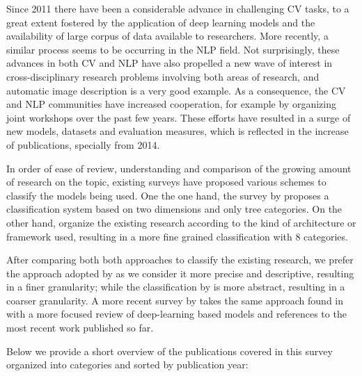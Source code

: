 Since 2011 there have been a considerable advance in challenging CV tasks, to a great extent fostered by the application of deep learning models and the availability of large corpus of data available to researchers. More recently, a similar process seems to be occurring in the NLP field. Not surprisingly, these advances in both CV and NLP have also propelled a new wave of interest in cross-disciplinary research problems involving both areas of research, and automatic image description is a very good example. As a consequence, the CV and NLP communities have increased cooperation, for example by organizing joint workshops over the past few years. These efforts have resulted in a surge of new models, datasets and evaluation measures, which is reflected in the increase of publications, specially from 2014. 

In order of ease of review, understanding and comparison of the growing amount of research on the topic, existing surveys have proposed various schemes to classify the models being used.
One the one hand, the survey by \citet{Bernardi2017} proposes a classification system based on two dimensions and only tree categories. On the other hand, \citet{Bai2018} organize the existing research according to the kind of architecture or framework used, resulting in a more fine grained classification with 8 categories. 

After comparing both both approaches to classify the existing research, we  prefer the approach adopted by \citet{Bai2018} as we consider it more precise and descriptive,  resulting in a finer granularity; while the classification by \cite{Bernardi2017} is more abstract, resulting in a coarser granularity. A more recent survey by \citet{Hossain2019} takes the same approach found in \citep{Bai2018} with a more focused review of deep-learning based models and references to the most recent work published so far.

Below we provide a short overview of the publications covered in this survey organized into categories and sorted by publication year:

